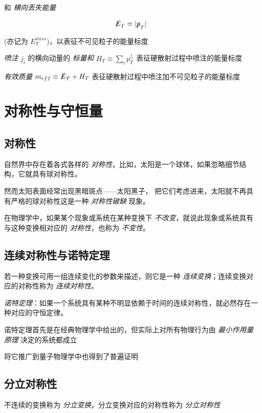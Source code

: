 和 \emph{横向丢失能量}

\begin{equation}
    \slashed{E}_T \equiv |\slashed{p}_T|
\end{equation}

(亦记为 $E^{miss}_T$)，以表征不可见粒子的能量标度

\emph{喷注} $j_i$ 的横向动量的 \emph{标量和} $H_T \equiv \sum_i p^{j_i}_T$ 表征硬散射过程中喷注的能量标度

\emph{有效质量} $m_{eff} \equiv \slashed{E}_T + H_T$ 表征硬散射过程中喷注加不可见粒子的能量标度

\section{对称性与守恒量}

\subsection{对称性}

自然界中存在着各式各样的 \emph{对称性}，比如，太阳是一个球体，如果忽略细节结构，它就具有球对称性。

然而太阳表面经常出现黑暗斑点——太阳黑子， 把它们考虑进来，太阳就不再具有严格的球对称性这是一种 \emph{对称性破缺} 现象。

在物理学中，如果某个现象或系统在某种变换下 \emph{不改变}，就说此现象或系统具有
与这种变换相对应的 \emph{对称性}，也称为 \emph{不变性}。

\subsection{连续对称性与诺特定理}

若一种变换可用一组连续变化的参数来描述，则它是一种 \emph{连续变换}；连续变换对应的对称性称为 \emph{连续对称性}。

\emph{诺特定理}：如果一个系统具有某种不明显依赖于时间的连续对称性，就必然存在一种对应的守恒定律。

诺特定理首先是在经典物理学中给出的，但实际上对所有物理行为由 \emph{最小作用量原理} 决定的系统都成立

将它推广到量子物理学中也得到了普遍证明

\subsection{分立对称性}

不连续的变换称为 \emph{分立变换}，分立变换对应的对称性称为 \emph{分立对称性}


